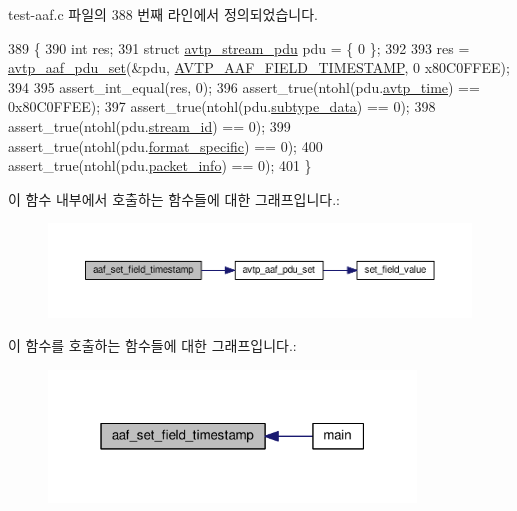 test-\/aaf.\+c 파일의 388 번째 라인에서 정의되었습니다.


\begin{DoxyCode}
389 \{
390     \textcolor{keywordtype}{int} res;
391     \textcolor{keyword}{struct }\hyperlink{structavtp__stream__pdu}{avtp\_stream\_pdu} pdu = \{ 0 \};
392 
393     res = \hyperlink{avtp__aaf_8h_af242dc7ed6c5ca5ea8e9d5071c13e19d}{avtp\_aaf\_pdu\_set}(&pdu, \hyperlink{avtp__aaf_8h_a7eaee6c1ebc806c0401dbe7b14cd22dba2b2d9a400ce400921c5e96caabf8a631}{AVTP\_AAF\_FIELD\_TIMESTAMP}, 0
      x80C0FFEE);
394 
395     assert\_int\_equal(res, 0);
396     assert\_true(ntohl(pdu.\hyperlink{structavtp__stream__pdu_a81ec49d93f7a916531f4d97214f47515}{avtp\_time}) == 0x80C0FFEE);
397     assert\_true(ntohl(pdu.\hyperlink{structavtp__stream__pdu_a3210e9f18fdc9c29cef7600c4d1e67e9}{subtype\_data}) == 0);
398     assert\_true(ntohl(pdu.\hyperlink{structavtp__stream__pdu_af5af7b461263e29ceb91a8d3a8bc2c97}{stream\_id}) == 0);
399     assert\_true(ntohl(pdu.\hyperlink{structavtp__stream__pdu_acbfc36b550978f88cf0a3d9d2b2ce0dd}{format\_specific}) == 0);
400     assert\_true(ntohl(pdu.\hyperlink{structavtp__stream__pdu_a737b6c4ff9f6954da39283e7351cbf58}{packet\_info}) == 0);
401 \}
\end{DoxyCode}


이 함수 내부에서 호출하는 함수들에 대한 그래프입니다.\+:
\nopagebreak
\begin{figure}[H]
\begin{center}
\leavevmode
\includegraphics[width=350pt]{test-aaf_8c_afb76b623dfe83b5e3e96025c6048a35f_cgraph}
\end{center}
\end{figure}




이 함수를 호출하는 함수들에 대한 그래프입니다.\+:
\nopagebreak
\begin{figure}[H]
\begin{center}
\leavevmode
\includegraphics[width=277pt]{test-aaf_8c_afb76b623dfe83b5e3e96025c6048a35f_icgraph}
\end{center}
\end{figure}


